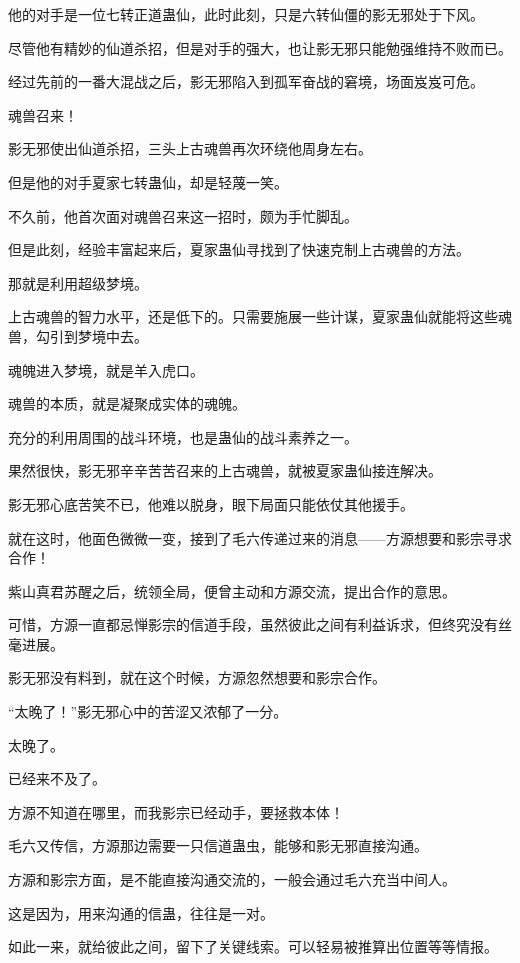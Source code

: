 \begin{this_body}
他的对手是一位七转正道蛊仙，此时此刻，只是六转仙僵的影无邪处于下风。

尽管他有精妙的仙道杀招，但是对手的强大，也让影无邪只能勉强维持不败而已。

经过先前的一番大混战之后，影无邪陷入到孤军奋战的窘境，场面岌岌可危。

魂兽召来！

影无邪使出仙道杀招，三头上古魂兽再次环绕他周身左右。

但是他的对手夏家七转蛊仙，却是轻蔑一笑。

不久前，他首次面对魂兽召来这一招时，颇为手忙脚乱。

但是此刻，经验丰富起来后，夏家蛊仙寻找到了快速克制上古魂兽的方法。

那就是利用超级梦境。

上古魂兽的智力水平，还是低下的。只需要施展一些计谋，夏家蛊仙就能将这些魂兽，勾引到梦境中去。

魂魄进入梦境，就是羊入虎口。

魂兽的本质，就是凝聚成实体的魂魄。

充分的利用周围的战斗环境，也是蛊仙的战斗素养之一。

果然很快，影无邪辛辛苦苦召来的上古魂兽，就被夏家蛊仙接连解决。

影无邪心底苦笑不已，他难以脱身，眼下局面只能依仗其他援手。

就在这时，他面色微微一变，接到了毛六传递过来的消息——方源想要和影宗寻求合作！

紫山真君苏醒之后，统领全局，便曾主动和方源交流，提出合作的意思。

可惜，方源一直都忌惮影宗的信道手段，虽然彼此之间有利益诉求，但终究没有丝毫进展。

影无邪没有料到，就在这个时候，方源忽然想要和影宗合作。

“太晚了！”影无邪心中的苦涩又浓郁了一分。

太晚了。

已经来不及了。

方源不知道在哪里，而我影宗已经动手，要拯救本体！

毛六又传信，方源那边需要一只信道蛊虫，能够和影无邪直接沟通。

方源和影宗方面，是不能直接沟通交流的，一般会通过毛六充当中间人。

这是因为，用来沟通的信蛊，往往是一对。

如此一来，就给彼此之间，留下了关键线索。可以轻易被推算出位置等等情报。


\end{this_body}
